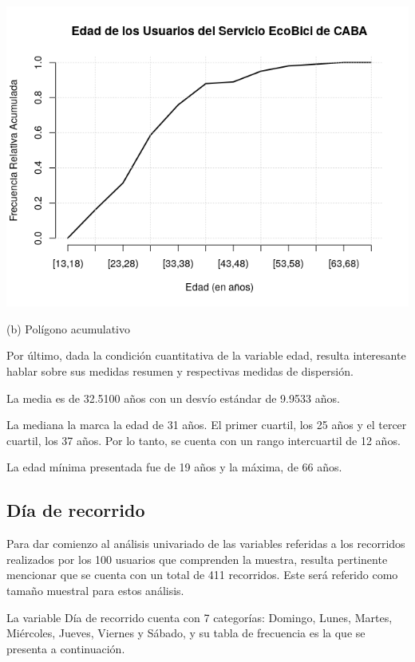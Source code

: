 \documentclass[11pt]{article}
\begin{document}
    \begin{center}
    \includegraphics[scale=0.55]{PoligAcumEdad.png}
    \vspace{-4mm}

    (b) Pol\'igono acumulativo
    \end{center}

    Por \'ultimo, dada la condici\'on cuantitativa de la variable edad, resulta interesante hablar sobre sus medidas resumen y respectivas medidas de dispersi\'on. 

    La media es de 32.5100 a\~{n}os con un desv\'io est\'andar de 9.9533 a\~{n}os.

    La mediana la marca la edad de 31 a\~{n}os. El primer cuartil, los 25 a\~{n}os y el tercer cuartil, los 37 a\~{n}os. Por lo tanto, se cuenta con un rango intercuartil de 12 a\~{n}os. 

    La edad m\'inima presentada fue de 19 a\~{n}os y la m\'axima, de 66 a\~{n}os.


  \subsection{D\'ia de recorrido}
  Para dar comienzo al an\'alisis univariado de las variables referidas a los recorridos realizados por los 100 usuarios que 
  comprenden la muestra, resulta pertinente mencionar que se cuenta con un total de 411 recorridos. Este ser\'a referido como tama\~no muestral para estos an\'alisis. 

  La variable D\'ia de recorrido cuenta con 7 categor\'ias: Domingo, Lunes, Martes, Mi\'ercoles, Jueves, Viernes y S\'abado, y su tabla de frecuencia es la que se presenta a continuaci\'on. 
\end{document}
